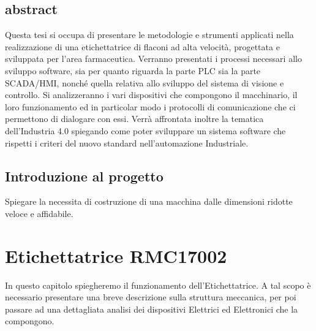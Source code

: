 \documentclass[12pt, a4paper, oneside]{book}
\begin{document}
\tableofcontents
{}

\newpage
\thispagestyle{empty}
\listoffigures

\newpage
\thispagestyle{empty}
\section*{abstract}
Questa tesi si occupa di presentare le metodologie e strumenti applicati nella realizzazione di una etichettatrice di flaconi ad alta velocità, progettata e sviluppata per l'area farmaceutica.
Verranno presentati i processi necessari allo sviluppo software, sia per quanto riguarda la parte PLC sia la parte SCADA/HMI, nonché quella relativa allo sviluppo del sistema di visione e controllo.
Si analizzeranno i vari dispositivi che compongono il macchinario, il loro funzionamento ed in particolar modo i protocolli di comunicazione che ci permettono di dialogare con essi. 
Verrà affrontata inoltre la tematica dell'Industria 4.0 spiegando come poter sviluppare un sistema software che rispetti i criteri del nuovo standard nell'automazione Industriale.
 

\newpage
\thispagestyle{empty}
\section*{Introduzione al progetto}
Spiegare la necessita di costruzione di una macchina dalle dimensioni ridotte veloce e affidabile. 

\chapter{Etichettatrice RMC17002}
In questo capitolo spiegheremo il funzionamento dell'Etichettatrice. A tal scopo è necessario presentare una breve descrizione sulla struttura meccanica, per poi passare ad una dettagliata analisi dei dispositivi Elettrici ed Elettronici che la compongono.
\end{document}
